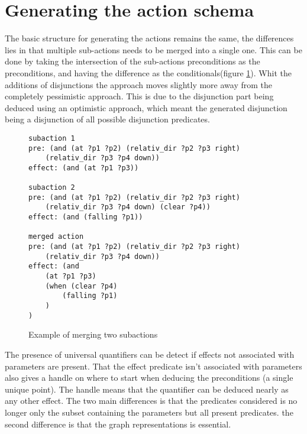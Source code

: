 	
	
\section{Generating the action schema}	
	
	The basic structure for generating the actions remains the same, the differences lies in that multiple sub-actions needs to be merged into a single one. This can be done by taking the intersection of the sub-actions preconditions as the preconditions, and having the difference as the conditionals(figure \ref{merge}). Whit the additions of disjunctions the approach moves slightly more away from the completely pessimistic approach. This is due to the disjunction part being deduced using an optimistic approach, which meant the generated disjunction being a disjunction of all possible disjunction predicates.
\begin{figure}
	\caption{Example of merging two subactions}
	\label{merge}
		\begin{lstlisting}
subaction 1
pre: (and (at ?p1 ?p2) (relativ_dir ?p2 ?p3 right) 
	(relativ_dir ?p3 ?p4 down))
effect: (and (at ?p1 ?p3))
		
subaction 2
pre: (and (at ?p1 ?p2) (relativ_dir ?p2 ?p3 right) 
	(relativ_dir ?p3 ?p4 down) (clear ?p4))
effect: (and (falling ?p1))
		
merged action
pre: (and (at ?p1 ?p2) (relativ_dir ?p2 ?p3 right) 
	(relativ_dir ?p3 ?p4 down))
effect: (and 
	(at ?p1 ?p3)
	(when (clear ?p4) 
		(falling ?p1)
	)
)
\end{lstlisting}
\end{figure}	

	
	
	


	The presence of universal quantifiers can be detect if effects not associated with parameters are present. That the effect predicate isn't associated with parameters also gives a handle on where to start when deducing the preconditions (a single unique point). The handle means that the quantifier can be deduced nearly as any other effect. The two main differences is that the predicates considered is no longer only the subset containing the parameters but all present predicates. the second  difference is that the graph representations is essential. 
	
